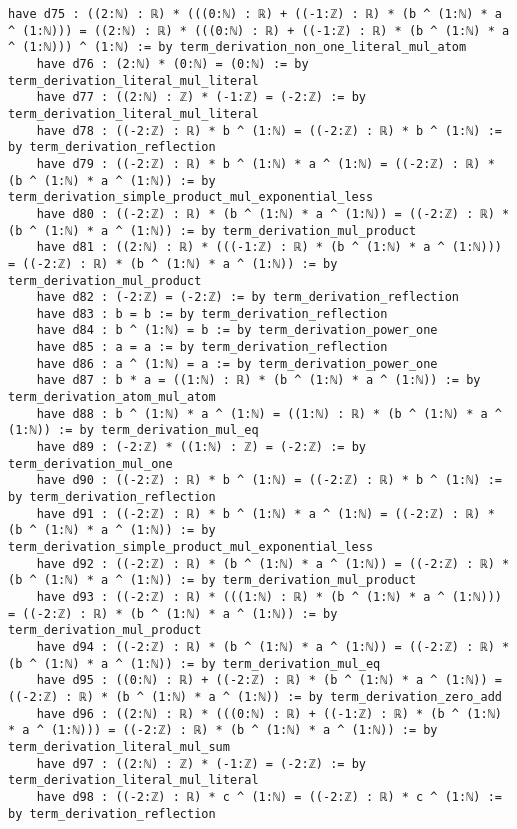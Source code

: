 \documentclass{article}
\begin{document}
\begin{tcolorbox}[colback=white!10, width=\linewidth]
\begin{lstlisting}[language=Lean4]
    have d75 : ((2:ℕ) : ℝ) * (((0:ℕ) : ℝ) + ((-1:ℤ) : ℝ) * (b ^ (1:ℕ) * a ^ (1:ℕ))) = ((2:ℕ) : ℝ) * (((0:ℕ) : ℝ) + ((-1:ℤ) : ℝ) * (b ^ (1:ℕ) * a ^ (1:ℕ))) ^ (1:ℕ) := by term_derivation_non_one_literal_mul_atom
    have d76 : (2:ℕ) * (0:ℕ) = (0:ℕ) := by term_derivation_literal_mul_literal
    have d77 : ((2:ℕ) : ℤ) * (-1:ℤ) = (-2:ℤ) := by term_derivation_literal_mul_literal
    have d78 : ((-2:ℤ) : ℝ) * b ^ (1:ℕ) = ((-2:ℤ) : ℝ) * b ^ (1:ℕ) := by term_derivation_reflection
    have d79 : ((-2:ℤ) : ℝ) * b ^ (1:ℕ) * a ^ (1:ℕ) = ((-2:ℤ) : ℝ) * (b ^ (1:ℕ) * a ^ (1:ℕ)) := by term_derivation_simple_product_mul_exponential_less
    have d80 : ((-2:ℤ) : ℝ) * (b ^ (1:ℕ) * a ^ (1:ℕ)) = ((-2:ℤ) : ℝ) * (b ^ (1:ℕ) * a ^ (1:ℕ)) := by term_derivation_mul_product
    have d81 : ((2:ℕ) : ℝ) * (((-1:ℤ) : ℝ) * (b ^ (1:ℕ) * a ^ (1:ℕ))) = ((-2:ℤ) : ℝ) * (b ^ (1:ℕ) * a ^ (1:ℕ)) := by term_derivation_mul_product
    have d82 : (-2:ℤ) = (-2:ℤ) := by term_derivation_reflection
    have d83 : b = b := by term_derivation_reflection
    have d84 : b ^ (1:ℕ) = b := by term_derivation_power_one
    have d85 : a = a := by term_derivation_reflection
    have d86 : a ^ (1:ℕ) = a := by term_derivation_power_one
    have d87 : b * a = ((1:ℕ) : ℝ) * (b ^ (1:ℕ) * a ^ (1:ℕ)) := by term_derivation_atom_mul_atom
    have d88 : b ^ (1:ℕ) * a ^ (1:ℕ) = ((1:ℕ) : ℝ) * (b ^ (1:ℕ) * a ^ (1:ℕ)) := by term_derivation_mul_eq
    have d89 : (-2:ℤ) * ((1:ℕ) : ℤ) = (-2:ℤ) := by term_derivation_mul_one
    have d90 : ((-2:ℤ) : ℝ) * b ^ (1:ℕ) = ((-2:ℤ) : ℝ) * b ^ (1:ℕ) := by term_derivation_reflection
    have d91 : ((-2:ℤ) : ℝ) * b ^ (1:ℕ) * a ^ (1:ℕ) = ((-2:ℤ) : ℝ) * (b ^ (1:ℕ) * a ^ (1:ℕ)) := by term_derivation_simple_product_mul_exponential_less
    have d92 : ((-2:ℤ) : ℝ) * (b ^ (1:ℕ) * a ^ (1:ℕ)) = ((-2:ℤ) : ℝ) * (b ^ (1:ℕ) * a ^ (1:ℕ)) := by term_derivation_mul_product
    have d93 : ((-2:ℤ) : ℝ) * (((1:ℕ) : ℝ) * (b ^ (1:ℕ) * a ^ (1:ℕ))) = ((-2:ℤ) : ℝ) * (b ^ (1:ℕ) * a ^ (1:ℕ)) := by term_derivation_mul_product
    have d94 : ((-2:ℤ) : ℝ) * (b ^ (1:ℕ) * a ^ (1:ℕ)) = ((-2:ℤ) : ℝ) * (b ^ (1:ℕ) * a ^ (1:ℕ)) := by term_derivation_mul_eq
    have d95 : ((0:ℕ) : ℝ) + ((-2:ℤ) : ℝ) * (b ^ (1:ℕ) * a ^ (1:ℕ)) = ((-2:ℤ) : ℝ) * (b ^ (1:ℕ) * a ^ (1:ℕ)) := by term_derivation_zero_add
    have d96 : ((2:ℕ) : ℝ) * (((0:ℕ) : ℝ) + ((-1:ℤ) : ℝ) * (b ^ (1:ℕ) * a ^ (1:ℕ))) = ((-2:ℤ) : ℝ) * (b ^ (1:ℕ) * a ^ (1:ℕ)) := by term_derivation_literal_mul_sum
    have d97 : ((2:ℕ) : ℤ) * (-1:ℤ) = (-2:ℤ) := by term_derivation_literal_mul_literal
    have d98 : ((-2:ℤ) : ℝ) * c ^ (1:ℕ) = ((-2:ℤ) : ℝ) * c ^ (1:ℕ) := by term_derivation_reflection

\end{lstlisting}
\end{tcolorbox}
\end{document}
